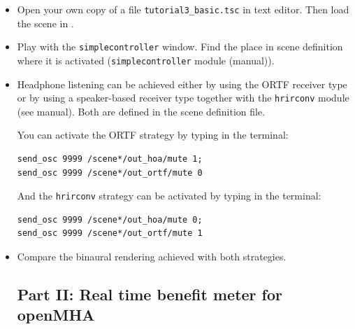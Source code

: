 \documentclass[11pt,a4paper,twoside]{article}
\begin{document}
\begin{itemize}
\item Open your own copy of a file \verb!tutorial3_basic.tsc! in text
  editor. Then load the scene in \tascar{}.
\item Play with the \verb!simplecontroller! window. Find the place in
  scene definition where it is activated (\verb!simplecontroller!
  module (manual)).
\item Headphone listening can be achieved either by using the ORTF receiver type 
or by using a speaker-based receiver type together with the  
\verb!hrirconv! module (see manual). Both are defined in the scene definition file. 

You can activate the ORTF strategy by typing in the terminal: 
\begin{verbatim}
send_osc 9999 /scene*/out_hoa/mute 1;
send_osc 9999 /scene*/out_ortf/mute 0
\end{verbatim}

And the \verb!hrirconv! strategy can be activated by typing in the terminal:
\begin{verbatim}
send_osc 9999 /scene*/out_hoa/mute 0;
send_osc 9999 /scene*/out_ortf/mute 1
\end{verbatim}

\item Compare the binaural rendering achieved with both strategies. 

\subsection*{Part II: Real time benefit meter for openMHA}


\end{itemize}
\end{document}
